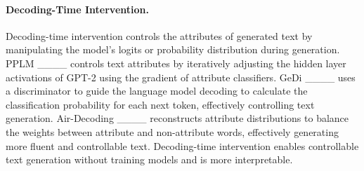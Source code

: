 \paragraph{Decoding-Time Intervention.} Decoding-time intervention controls the attributes of generated text by manipulating the model's logits or probability distribution during generation. PPLM ____ controls text attributes by iteratively adjusting the hidden layer activations of GPT-2 using the gradient of attribute classifiers. GeDi ____ uses a discriminator to guide the language model decoding to calculate the classification probability for each next token, effectively controlling text generation. Air-Decoding ____ reconstructs attribute distributions to balance the weights between attribute and non-attribute words, effectively generating more fluent and controllable text. Decoding-time intervention enables controllable text generation without training models and is more interpretable.